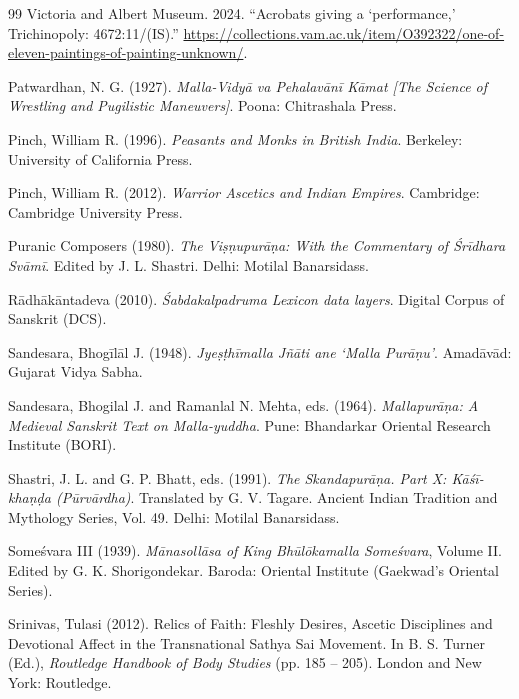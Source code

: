 \documentclass[11pt,twoside,letterpaper]{article}
\begin{document}
\begin{thebibliography}{99}
Victoria and Albert Museum. 2024. ``Acrobats giving a `performance,' Trichinopoly: 4672:11/(IS).'' \url{https://collections.vam.ac.uk/item/O392322/one-of-eleven-paintings-of-painting-unknown/}.

Patwardhan, N. G. (1927). \textit{Malla-Vidy\={a} va Pehalav\={a}n\={i} K\={a}mat [The Science of Wrestling and Pugilistic Maneuvers]}. Poona: Chitrashala Press.

Pinch, William R. (1996). \textit{Peasants and Monks in British India}. Berkeley: University of California Press.

Pinch, William R. (2012). \textit{Warrior Ascetics and Indian Empires}. Cambridge: Cambridge University Press.

Puranic Composers (1980). \textit{The Vi\d{s}\d{n}upur\={a}\d{n}a: With the Commentary of \'{S}r\={i}dhara Sv\={a}m\={i}}. Edited by J. L. Shastri. Delhi: Motilal Banarsidass.

R\={a}dh\={a}k\={a}ntadeva (2010). \textit{\'{S}abdakalpadruma Lexicon data layers}. Digital Corpus of Sanskrit (DCS).

Sandesara, Bhog\={i}l\={a}l J. (1948). \textit{Jye\d{s}\d{t}h\={i}malla J\~{n}\={a}ti ane `Malla Pur\={a}\d{n}u'}. Amad\={a}v\={a}d: Gujarat Vidya Sabha.

Sandesara, Bhogilal J. and Ramanlal N. Mehta, eds. (1964). \textit{Mallapur\={a}\d{n}a: A Medieval Sanskrit Text on Malla-yuddha}. Pune: Bhandarkar Oriental Research Institute (BORI).

Shastri, J. L. and G. P. Bhatt, eds. (1991). \textit{The Skandapur\={a}\d{n}a. Part X: K\={a}\'s\={i}-kha\d{n}\d{d}a (P\={u}rv\={a}rdha)}. Translated by G. V. Tagare. Ancient Indian Tradition and Mythology Series, Vol. 49. Delhi: Motilal Banarsidass.

Some\'svara III (1939). \textit{M\={a}nasoll\={a}sa of King Bh\={u}lōkamalla Some\'svara}, Volume II. Edited by G. K. Shorigondekar. Baroda: Oriental Institute (Gaekwad's Oriental Series).

Srinivas, Tulasi (2012). Relics of Faith: Fleshly Desires, Ascetic Disciplines and Devotional Affect in the Transnational Sathya Sai Movement. In B. S. Turner (Ed.), \textit{Routledge Handbook of Body Studies} (pp. 185 -- 205). London and New York: Routledge.


\end{thebibliography}
\end{document}
